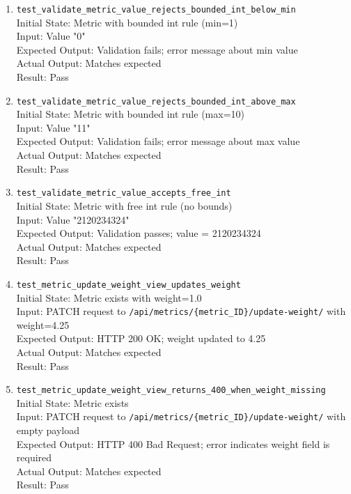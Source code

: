 \documentclass[12pt, titlepage]{article}
\begin{document}
\begin{enumerate}
    \item \texttt{test\_validate\_metric\_value\_rejects\_bounded\_int\_below\_min} \label{test-validate-metric-value-rejects-bounded-int-below-min}
      \\Initial State: Metric with bounded int rule (min=1)
      \\Input: Value "0"
      \\Expected Output: Validation fails; error message about min value
      \\Actual Output: Matches expected
      \\Result: Pass

    \item \texttt{test\_validate\_metric\_value\_rejects\_bounded\_int\_above\_max} \label{test-validate-metric-value-rejects-bounded-int-above-max}
      \\Initial State: Metric with bounded int rule (max=10)
      \\Input: Value "11"
      \\Expected Output: Validation fails; error message about max value
      \\Actual Output: Matches expected
      \\Result: Pass

    \item \texttt{test\_validate\_metric\_value\_accepts\_free\_int} \label{test-validate-metric-value-accepts-free-int}
      \\Initial State: Metric with free int rule (no bounds)
      \\Input: Value "2120234324"
      \\Expected Output: Validation passes; value = 2120234324
      \\Actual Output: Matches expected
      \\Result: Pass
    \item \texttt{test\_metric\_update\_weight\_view\_updates\_weight} \label{test-metric-update-weight-view-updates-weight}
      \\Initial State: Metric exists with weight=1.0
      \\Input: PATCH request to \texttt{/api/metrics/\{metric\_ID\}/update-weight/} with weight=4.25
      \\Expected Output: HTTP 200 OK; weight updated to 4.25
      \\Actual Output: Matches expected
      \\Result: Pass

    \item \texttt{test\_metric\_update\_weight\_view\_returns\_400\_when\_weight\_missing} \label{test-metric-update-weight-view-returns-400-when-weight-missing}
      \\Initial State: Metric exists
      \\Input: PATCH request to \texttt{/api/metrics/\{metric\_ID\}/update-weight/} with empty payload
      \\Expected Output: HTTP 400 Bad Request; error indicates weight field is required
      \\Actual Output: Matches expected
      \\Result: Pass


\end{enumerate}
\end{document}
